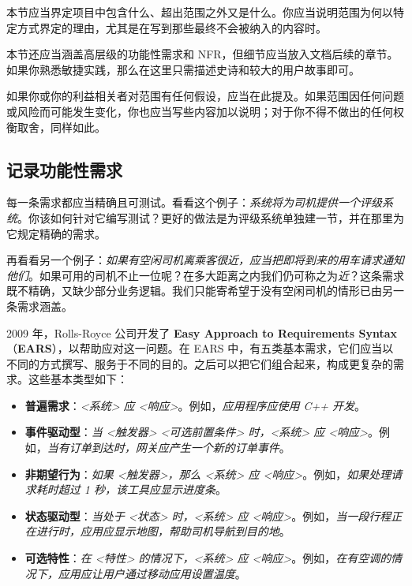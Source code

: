 \label{idx:172}
本节应当界定项目中包含什么、超出范围之外又是什么。你应当说明范围为何以特定方式界定的理由，尤其是在写到那些最终不会被纳入的内容时。

本节还应当涵盖高层级的功能性需求和 NFR，但细节应当放入文档后续的章节。如果你熟悉敏捷实践，那么在这里只需描述史诗和较大的用户故事即可。

如果你或你的利益相关者对范围有任何假设，应当在此提及。如果范围因任何问题或风险而可能发生变化，你也应当写些内容加以说明；对于你不得不做出的任何权衡取舍，同样如此。

\subsection{记录功能性需求}

\label{idx:173}
每一条需求都应当精确且可测试。看看这个例子：\emph{系统将为司机提供一个评级系统}。你该如何针对它编写测试？更好的做法是为评级系统单独建一节，并在那里为它规定精确的需求。

再看看另一个例子：\emph{如果有空闲司机离乘客很近，应当把即将到来的用车请求通知他们}。如果可用的司机不止一位呢？在多大距离之内我们仍可称之为\emph{近}？这条需求既不精确，又缺少部分业务逻辑。我们只能寄希望于没有空闲司机的情形已由另一条需求涵盖。

\label{idx:174}
2009 年，Rolls-Royce 公司开发了 \textbf{Easy Approach to Requirements Syntax }（\textbf{EARS}），以帮助应对这一问题。在 EARS 中，有五类基本需求，它们应当以不同的方式撰写、服务于不同的目的。之后可以把它们组合起来，构成更复杂的需求。这些基本类型如下：

\begin{itemize}
\item \textbf{普遍需求}：\emph{<系统> 应 <响应>}。例如，\emph{应用程序应使用 C++ 开发}。
\item \textbf{事件驱动型}：\emph{当 <触发器> <可选前置条件> 时，<系统> 应 <响应>}。例如，\emph{当有订单到达时，网关应产生一个新的订单事件}。
\item \textbf{非期望行为}：\emph{如果 <触发器>，那么 <系统> 应 <响应>}。例如，\emph{如果处理请求耗时超过 1 秒，该工具应显示进度条}。
\item \textbf{状态驱动型}：\emph{当处于 <状态> 时，<系统> 应 <响应>}。例如，\emph{当一段行程正在进行时，应用应显示地图，帮助司机导航到目的地}。
\item \textbf{可选特性}：\emph{在 <特性> 的情况下，<系统> 应 <响应>}。例如，\emph{在有空调的情况下，应用应让用户通过移动应用设置温度}。
\end{itemize}

